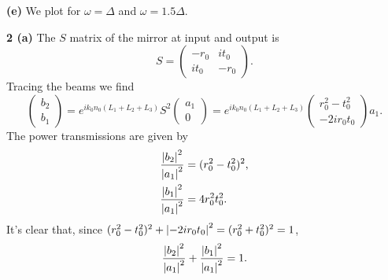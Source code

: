 \documentclass{article}
\makeatletter
\newcommand*{\shifttext}[1]{%
  \settowidth{\@tempdima}{#1}%
  \hspace{-\@tempdima}#1%
}
\newcommand{\plabel}[1]{%
\shifttext{\textbf{#1}\quad}%
}
\newcommand{\prule}{%
\begin{center}%
\hdashrule[0.5ex]{.99\linewidth}{1pt}{1pt 2.5pt}%
\end{center}%
}
\makeatother
\begin{document}
\plabel{(e)}%
We plot for $\omega = \Delta$ and $\omega=1.5\Delta$.
\begin{center}
\end{center}

\prule
\plabel{2 (a)}%
The $S$ matrix of the mirror at input and output is
\[ S = \begin{pmatrix}
    -r_0 & it_0 \\
    it_0 & -r_0
\end{pmatrix}. \]
Tracing the beams we find
\[ \begin{pmatrix}
    b_2 \\ b_1
\end{pmatrix} = e^{i k_0 n_0 (L_1+L_2+L_3)} S^2 \begin{pmatrix}
    a_1 \\ 0
\end{pmatrix} = e^{i k_0 n_0 (L_1+L_2+L_3)} \begin{pmatrix}
    r_0^2 - t_0^2 \\
    -2 i r_0 t_0
\end{pmatrix} a_1. \]
The power transmissions are given by
\begin{align}
    \label{eq:e2}\frac{\abs{b_2}^2}{\abs{a_1}^2} &= (r_0^2 - t_0^2)^2, \\
    \label{eq:e1}\frac{\abs{b_1}^2}{\abs{a_1}^2} &= 4r_0^2 t_0^2.
\end{align}
It's clear that, since $(r_0^2 - t_0^2)^2 + \abs{-2ir_0t_0}^2 = (r_0^2 + t_0^2)^2 = 1$,
\[ \frac{\abs{b_2}^2}{\abs{a_1}^2} + \frac{\abs{b_1}^2}{\abs{a_1}^2} = 1. \]
\end{document}
